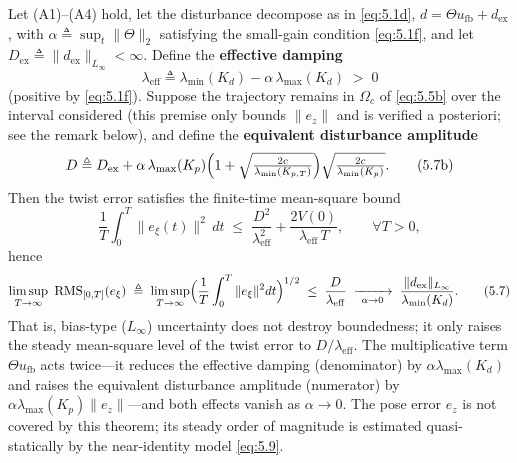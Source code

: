 \renewcommand{\thetheorem}{3(d)}%
\begin{theorem}\label{thm:3d}
Let (A1)--(A4) hold, let the disturbance decompose as in \eqref{eq:5.1d}, $d=\Theta u_{\mathrm{fb}}+d_{\mathrm{ex}}$, with $\alpha\triangleq\sup_t\|\Theta\|_2$ satisfying the small-gain condition \eqref{eq:5.1f}, and let $D_{\mathrm{ex}}\triangleq\|d_{\mathrm{ex}}\|_{L_\infty}<\infty$. Define the \textbf{effective damping}
\begin{equation}
\lambda_{\mathrm{eff}}\triangleq\lambda_{\min}(K_d)-\alpha\,\lambda_{\max}(K_d)\;>\;0
\tag{5.7a}\label{eq:5.7a}
\end{equation}
(positive by \eqref{eq:5.1f}). Suppose the trajectory remains in $\Omega_c$ of \eqref{eq:5.5b} over the interval considered (this premise only bounds $\|e_z\|$ and is verified a posteriori; see the remark below), and define the \textbf{equivalent disturbance amplitude}
\begin{equation}
D\triangleq D_{\mathrm{ex}}+\alpha\,\lambda_{\max}(K_p)\Bigl(1+\sqrt{\tfrac{2c}{\lambda_{\min}(K_{p,T})}}\Bigr)\sqrt{\tfrac{2c}{\lambda_{\min}(K_p)}} .
\tag{5.7b}\label{eq:5.7b}
\end{equation}
Then the twist error satisfies the finite-time mean-square bound
\begin{equation}
\frac1T\int_0^T\|e_\xi(t)\|^2\,dt\;\le\;\frac{D^2}{\lambda_{\mathrm{eff}}^2}+\frac{2V(0)}{\lambda_{\mathrm{eff}}\,T},
\qquad\forall T>0,
\tag{5.7c}\label{eq:5.7c}
\end{equation}
hence
\begin{equation}
\limsup_{T\to\infty}\ \mathrm{RMS}_{[0,T]}(e_\xi)
\;\triangleq\;\limsup_{T\to\infty}\Bigl(\frac1T\int_0^T\|e_\xi\|^2dt\Bigr)^{1/2}
\;\le\;\frac{D}{\lambda_{\mathrm{eff}}}
\;\xrightarrow[\ \alpha\to0\ ]{}\;\frac{\|d_{\mathrm{ex}}\|_{L_\infty}}{\lambda_{\min}(K_d)} .
\tag{5.7}\label{eq:5.7}
\end{equation}
That is, bias-type ($L_\infty$) uncertainty does not destroy boundedness; it only raises the steady mean-square level of the twist error to $D/\lambda_{\mathrm{eff}}$. The multiplicative term $\Theta u_{\mathrm{fb}}$ acts twice---it reduces the effective damping (denominator) by $\alpha\lambda_{\max}(K_d)$ and raises the equivalent disturbance amplitude (numerator) by $\alpha\lambda_{\max}(K_p)\|e_z\|$---and both effects vanish as $\alpha\to0$. The pose error $e_z$ is not covered by this theorem; its steady order of magnitude is estimated quasi-statically by the near-identity model \eqref{eq:5.9}.
\end{theorem}

